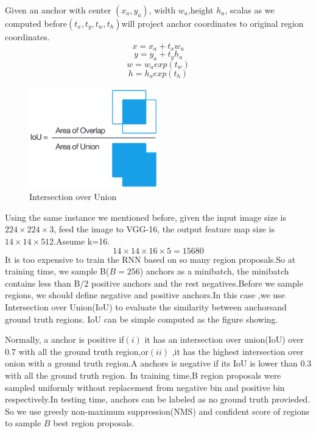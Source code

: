 \documentclass[12pt,a4paper]{report}
\begin{document}
Given an anchor with center $(x_a,y_a)$, width $w_a$,height $h_a$, scalas as we computed before$(t_x,t_y,t_w,t_h)$will project anchor coordinates to original region coordinates.\cite{frcnn}\cite{rnn}
\[x=x_a+t_xw_a\]
\[y=y_a+t_yh_a\]
\[w=w_aexp(t_w)\]
\[h=h_aexp(t_h)\]


\begin{figure}[h]
\centering
\includegraphics[width=0.5\textwidth]{iou.png}
\caption{Intersection over Union}
\end{figure}
Using the same instance we mentioned before, given the input image size is $224\times 224 \times 3$, feed the image to VGG-16, the output feature map size is $14\times 14\times 512$.Assume k=16.\[14\times 14\times 16\times 5=15680\] It is too expensive to train the RNN based on so many region proposals.So at training time, we sample B($B=256$) anchors as a minibatch, the minibatch contains less than B/2 positive anchors and the rest negatives.Before we sample regions, we should define negative and positive anchors.In this case ,we use Intersection over Union(IoU) to evaluate the similarity between anchorsand ground truth regions. IoU can be simple computed as the figure showing.

 Normally, a anchor is positive if$(i)$ it has an intersection over union(IoU) over 0.7 with all the ground truth region,or$(ii)$ ,it has the highest intersection over onion with a ground truth region.A anchors is negative if its IoU is lower than 0.3 with all the ground truth region. In training time,B region proposals were sampled uniformly  without replacement from negative bin and positive bin respectively.In testing time, anchors can be labeled as no ground truth provieded. So we use greedy non-maximum suppression(NMS) and confident score of regions to sample $B$ best region proposals.
 
\end{document}
